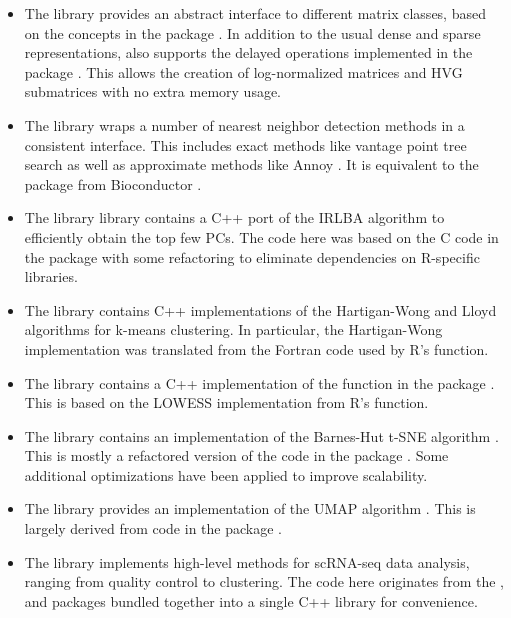 \documentclass{article}
\begin{document}
\begin{itemize}
\item The  library \cite{tatami} provides an abstract interface to different matrix classes, based on the concepts in the  package \cite{lun2018beachmat}. 
In addition to the usual dense and sparse representations,  also supports the delayed operations implemented in the  package \cite{delayedarray}.
This allows the creation of log-normalized matrices and HVG submatrices with no extra memory usage.
\item The  library \cite{knncolle} wraps a number of nearest neighbor detection methods in a consistent interface.
This includes exact methods like vantage point tree search as well as approximate methods like Annoy \cite{annoy}.
It is equivalent to the  package from Bioconductor \cite{biocneighbors}.
\item The  library \cite{cppirlba} library contains a C++ port of the IRLBA algorithm \cite{baglama2005augmented} to efficiently obtain the top few PCs.
The code here was based on the C code in the  package \cite{irlba} with some refactoring to eliminate dependencies on R-specific libraries.
\item The  library \cite{cppkmeans} contains C++ implementations of the Hartigan-Wong \cite{hartiganwong} and Lloyd algorithms \cite{lloyd} for k-means clustering.
In particular, the Hartigan-Wong implementation was translated from the Fortran code used by R's  function.
\item The  library \cite{cppweightedlowess} contains a C++ implementation of the  function in the  package \cite{ritchie2015limma}.
This is based on the LOWESS implementation \cite{cleveland1979robust} from R's  function. 
\item The  library \cite{qdtsne} contains an implementation of the Barnes-Hut t-SNE algorithm \cite{maaten2014accelerating}.
This is mostly a refactored version of the code in the  package \cite{rtsne}.
Some additional optimizations have been applied to improve scalability.
\item The  library \cite{umappp} provides an implementation of the UMAP algorithm \cite{mcinnes2018umap}.
This is largely derived from code in the  package \cite{uwot}.
\item The  library implements high-level methods for scRNA-seq data analysis, ranging from quality control to clustering.
The code here originates from the ,  and  packages \cite{lun2016step,lun2017scater} bundled together into a single C++ library for convenience. 
\end{itemize}
\end{document}
